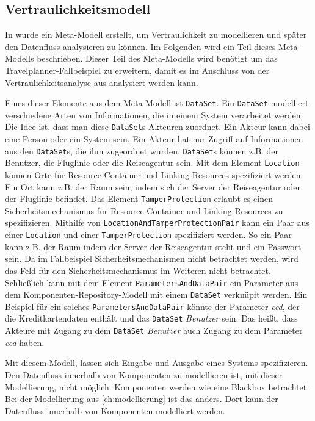 \subsection{Vertraulichkeitsmodell}
\label{sec:modellierung:confident}
In \cite{Kramera} wurde ein Meta-Modell erstellt, um Vertraulichkeit zu modellieren und später den Datenfluss analysieren zu können. Im Folgenden wird ein Teil dieses Meta-Modells beschrieben. Dieser Teil des Meta-Modells wird benötigt um das Travelplanner-Fallbeispiel zu erweitern, damit es im Anschluss von der Vertraulichkeitsanalyse aus \cite{Kramera} analysiert werden kann.\par
Eines dieser Elemente aus dem Meta-Modell ist \texttt{DataSet}. Ein \texttt{DataSet} modelliert verschiedene Arten von Informationen, die in einem System verarbeitet werden. Die Idee ist, dass man diese \texttt{DataSet}s Akteuren zuordnet. Ein Akteur kann dabei eine Person oder ein System sein. Ein Akteur hat nur Zugriff auf Informationen aus den \texttt{DataSet}s, die ihm zugeordnet wurden. \texttt{DataSet}s können z.B. der Benutzer, die Fluglinie oder die Reiseagentur sein. Mit dem Element \texttt{Location} können Orte für Resource-Container und Linking-Resources spezifiziert werden. Ein Ort kann z.B. der Raum sein, indem sich der Server der Reiseagentur oder der Fluglinie befindet. Das Element \texttt{TamperProtection} erlaubt es einen Sicherheitsmechanismus für Resource-Container und Linking-Resources zu spezifizieren. Mithilfe von \texttt{LocationAndTamperProtectionPair} kann ein Paar aus einer \texttt{Location} und einer \texttt{TamperProtection} spezifiziert werden. So ein Paar kann z.B. der Raum indem der Server der Reiseagentur steht und ein Passwort sein. Da im Fallbeispiel Sicherheitsmechanismen nicht betrachtet werden, wird das Feld für den Sicherheitsmechanismus im Weiteren nicht betrachtet. Schließlich kann mit dem Element \texttt{ParametersAndDataPair} ein Parameter aus dem Komponenten-Repository-Modell mit einem \texttt{DataSet} verknüpft werden. Ein Beispiel für ein solches \texttt{ParametersAndDataPair} könnte der Parameter \textit{ccd}, der die Kreditkartendaten enthält und das \texttt{DataSet} \textit{Benutzer} sein. Das heißt, dass Akteure mit Zugang zu dem \texttt{DataSet} \textit{Benutzer} auch Zugang zu dem Parameter \textit{ccd} haben. \par
Mit diesem Modell, lassen sich Eingabe und Ausgabe eines Systems spezifizieren. Den Datenfluss innerhalb von Komponenten zu modellieren ist, mit dieser Modellierung, nicht möglich. Komponenten werden wie eine Blackbox betrachtet. Bei der Modellierung aus \autoref{ch:modellierung} ist das anders. Dort kann der Datenfluss innerhalb von Komponenten modelliert werden. \par 
